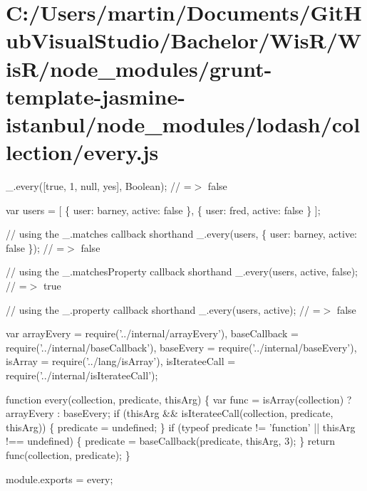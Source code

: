 \hypertarget{_c_1_2_users_2martin_2_documents_2_git_hub_visual_studio_2_bachelor_2_wis_r_2_wis_r_2node_module84271da04e2b06b523c5c3ca22a8a994}{}\section{C\+:/\+Users/martin/\+Documents/\+Git\+Hub\+Visual\+Studio/\+Bachelor/\+Wis\+R/\+Wis\+R/node\+\_\+modules/grunt-\/template-\/jasmine-\/istanbul/node\+\_\+modules/lodash/collection/every.\+js}
\+\_\+.\+every(\mbox{[}true, 1, null, \textquotesingle{}yes\textquotesingle{}\mbox{]}, Boolean); // =$>$ false

var users = \mbox{[} \{ \textquotesingle{}user\textquotesingle{}\+: \textquotesingle{}barney\textquotesingle{}, \textquotesingle{}active\textquotesingle{}\+: false \}, \{ \textquotesingle{}user\textquotesingle{}\+: \textquotesingle{}fred\textquotesingle{}, \textquotesingle{}active\textquotesingle{}\+: false \} \mbox{]};

// using the {\ttfamily \+\_\+.\+matches} callback shorthand \+\_\+.\+every(users, \{ \textquotesingle{}user\textquotesingle{}\+: \textquotesingle{}barney\textquotesingle{}, \textquotesingle{}active\textquotesingle{}\+: false \}); // =$>$ false

// using the {\ttfamily \+\_\+.\+matches\+Property} callback shorthand \+\_\+.\+every(users, \textquotesingle{}active\textquotesingle{}, false); // =$>$ true

// using the {\ttfamily \+\_\+.\+property} callback shorthand \+\_\+.\+every(users, \textquotesingle{}active\textquotesingle{}); // =$>$ false


\begin{DoxyCodeInclude}
var arrayEvery = require(\textcolor{stringliteral}{'../internal/arrayEvery'}),
    baseCallback = require(\textcolor{stringliteral}{'../internal/baseCallback'}),
    baseEvery = require(\textcolor{stringliteral}{'../internal/baseEvery'}),
    isArray = require(\textcolor{stringliteral}{'../lang/isArray'}),
    isIterateeCall = require(\textcolor{stringliteral}{'../internal/isIterateeCall'});

\textcolor{keyword}{function} every(collection, predicate, thisArg) \{
  var func = isArray(collection) ? arrayEvery : baseEvery;
  \textcolor{keywordflow}{if} (thisArg && isIterateeCall(collection, predicate, thisArg)) \{
    predicate = undefined;
  \}
  \textcolor{keywordflow}{if} (typeof predicate != \textcolor{stringliteral}{'function'} || thisArg !== undefined) \{
    predicate = baseCallback(predicate, thisArg, 3);
  \}
  \textcolor{keywordflow}{return} func(collection, predicate);
\}

module.exports = every;
\end{DoxyCodeInclude}
 
